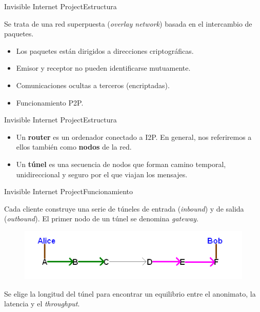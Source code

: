\documentclass[spanish]{beamer}
\begin{document}
\begin{frame}{Invisible Internet Project}{Estructura}

Se trata de una red superpuesta (\textit{overlay network}) basada en el intercambio de paquetes.

\begin{itemize}
	\item Los paquetes están dirigidos a direcciones criptográficas.
	\item Emisor y receptor no pueden identificarse mutuamente.
	\item Comunicaciones ocultas a terceros (encriptadas).
	\item Funcionamiento P2P.
\end{itemize}
	
\end{frame}



\begin{frame}{Invisible Internet Project}{Estructura}

\begin{itemize}
\item Un \textbf{router} es un ordenador conectado a I2P. En general, nos referiremos a ellos también como \textbf{nodos} de la red.
\item Un \textbf{túnel} es una secuencia de nodos que forman camino temporal, unidireccional y seguro por el que viajan los mensajes.
\end{itemize}

	
\end{frame}



\begin{frame}{Invisible Internet Project}{Funcionamiento}

Cada cliente construye una serie de túneles de entrada (\textit{inbound}) y de salida (\textit{outbound}). El primer nodo de un túnel se denomina \textit{gateway}.


\begin{figure}
	\centering
	\includegraphics[width=.7\textwidth]{img/alice_bob_tunnel}
\end{figure}

Se elige la longitud del túnel para encontrar un equilibrio entre el anonimato, la latencia y el \textit{throughput}.

\end{frame}
\end{document}
